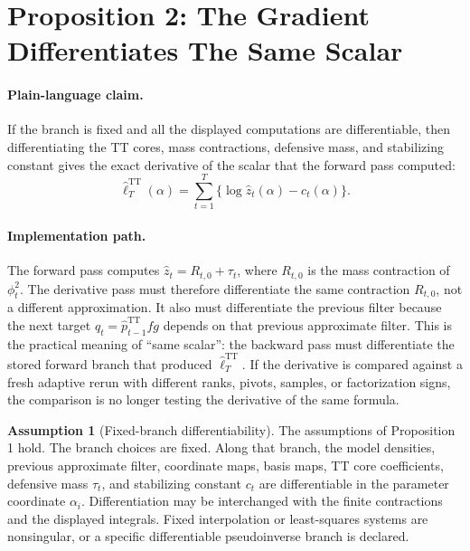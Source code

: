\documentclass[11pt]{article}
\newcommand{\TT}{\mathrm{TT}}
\theoremstyle{definition}
\newtheorem{assumption}{Assumption}
\theoremstyle{remark}
\begin{document}
\section{Proposition 2: The Gradient Differentiates The Same Scalar}

\paragraph{Plain-language claim.}
If the branch is fixed and all the displayed computations are differentiable,
then differentiating the TT cores, mass contractions, defensive mass, and
stabilizing constant gives the exact derivative of the scalar that the forward
pass computed:
\[
  \widehat\ell_T^{\TT}(\alpha)
  =
  \sum_{t=1}^T\{\log\widehat z_t(\alpha)-c_t(\alpha)\}.
\]

\paragraph{Implementation path.}
The forward pass computes \(\widehat z_t=R_{t,0}+\tau_t\), where \(R_{t,0}\)
is the mass contraction of \(\phi_t^2\).  The derivative pass must therefore
differentiate the same contraction \(R_{t,0}\), not a different approximation.
It also must differentiate the previous filter because the next target
\(q_t=\widehat p_{t-1}^{\TT}fg\) depends on that previous approximate filter.
This is the practical meaning of ``same scalar'': the backward pass must
differentiate the stored forward branch that produced
\(\widehat\ell_T^{\TT}\).  If the derivative is compared against a fresh
adaptive rerun with different ranks, pivots, samples, or factorization signs,
the comparison is no longer testing the derivative of the same formula.

\begin{assumption}[Fixed-branch differentiability]
The assumptions of Proposition 1 hold.  The branch choices are fixed.  Along
that branch, the model densities, previous approximate filter, coordinate
maps, basis maps, TT core coefficients, defensive mass \(\tau_t\), and
stabilizing constant \(c_t\) are differentiable in the parameter coordinate
\(\alpha_i\).  Differentiation may be interchanged with the finite contractions
and the displayed integrals.  Fixed interpolation or least-squares systems are
nonsingular, or a specific differentiable pseudoinverse branch is declared.
\end{assumption}
\end{document}
